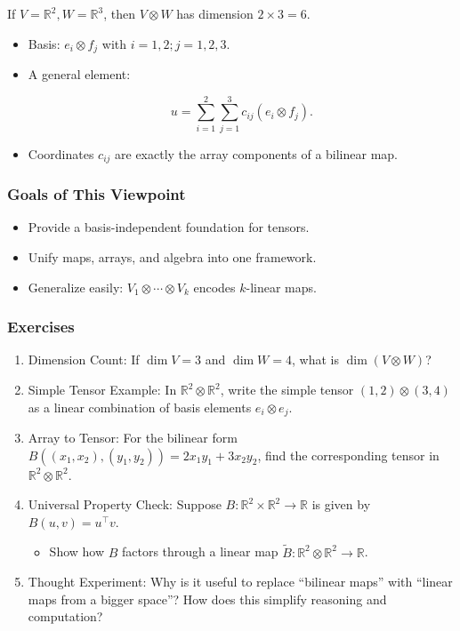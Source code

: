 \documentclass[
  letterpaper,
  DIV=11,
  numbers=noendperiod]{scrreprt}
\providecommand{\tightlist}{%
  \setlength{\itemsep}{0pt}\setlength{\parskip}{0pt}}
\begin{document}
If \(V = \mathbb{R}^2, W = \mathbb{R}^3\), then \(V \otimes W\) has
dimension \(2 \times 3 = 6\).

\begin{itemize}
\item
  Basis: \(e_i \otimes f_j\) with \(i=1,2; j=1,2,3\).
\item
  A general element:

  \[
  u = \sum_{i=1}^2 \sum_{j=1}^3 c_{ij} (e_i \otimes f_j).
  \]
\item
  Coordinates \(c_{ij}\) are exactly the array components of a bilinear
  map.
\end{itemize}

\subsubsection{Goals of This Viewpoint}\label{goals-of-this-viewpoint}

\begin{itemize}
\tightlist
\item
  Provide a basis-independent foundation for tensors.
\item
  Unify maps, arrays, and algebra into one framework.
\item
  Generalize easily: \(V_1 \otimes \cdots \otimes V_k\) encodes
  \(k\)-linear maps.
\end{itemize}

\subsubsection{Exercises}\label{exercises-16}

\begin{enumerate}
\def\labelenumi{\arabic{enumi}.}
\item
  Dimension Count: If \(\dim V = 3\) and \(\dim W = 4\), what is
  \(\dim(V \otimes W)\)?
\item
  Simple Tensor Example: In \(\mathbb{R}^2 \otimes \mathbb{R}^2\), write
  the simple tensor \((1,2) \otimes (3,4)\) as a linear combination of
  basis elements \(e_i \otimes e_j\).
\item
  Array to Tensor: For the bilinear form
  \(B((x_1,x_2),(y_1,y_2)) = 2x_1y_1 + 3x_2y_2\), find the corresponding
  tensor in \(\mathbb{R}^2 \otimes \mathbb{R}^2\).
\item
  Universal Property Check: Suppose
  \(B: \mathbb{R}^2 \times \mathbb{R}^2 \to \mathbb{R}\) is given by
  \(B(u,v) = u^\top v\).

  \begin{itemize}
  \tightlist
  \item
    Show how \(B\) factors through a linear map
    \(\tilde{B}: \mathbb{R}^2 \otimes \mathbb{R}^2 \to \mathbb{R}\).
  \end{itemize}
\item
  Thought Experiment: Why is it useful to replace ``bilinear maps'' with
  ``linear maps from a bigger space''? How does this simplify reasoning
  and computation?
\end{enumerate}
\end{document}
